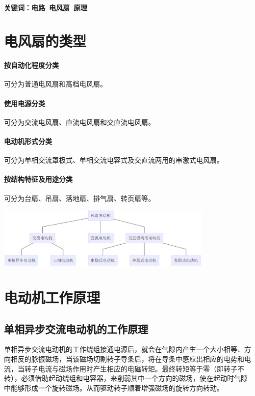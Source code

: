\documentclass[a4paper,11pt]{ctexart}
\begin{document}
\paragraph{关键词：电路\ 电风扇\ 原理}

\tableofcontents            %
\newpage


\section{电风扇的类型}
\paragraph{按自动化程度分类}可分为普通电风扇和高档电风扇。
\paragraph{使用电源分类}可分为交流电风扇、直流电风扇和交直流电风扇。
\paragraph{电动机形式分类}可分为单相交流罩极式、单相交流电容式及交直流两用的串激式电风扇。
\paragraph{按结构特征及用途分类}可分为台扇、吊扇、落地扇、排气扇、转页扇等。
\begin{center}
\includegraphics[width=0.8\textwidth]{./images/class.eps}
\end{center}


\section{电动机工作原理}
\subsection{单相异步交流电动机的工作原理}
单相异步交流电动机的工作绕组接通电源后，就会在气隙内产生一个大小相等、方向相反的脉振磁场，当该磁场切割转子导条后，将在导条中感应出相应的电势和电流，当转子电流与磁场作用时产生相应的电磁转矩。最终转矩等于零（即转子不转），必须借助起动绕组和电容器，来削弱其中一个方向的磁场，使在起动时气隙中能够形成一个旋转磁场。从而驱动转子顺着增强磁场的旋转方向转动。
\end{document}
